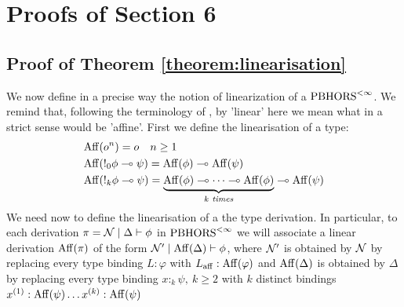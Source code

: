 \section{Proofs of Section 6}
\subsection{Proof of Theorem \ref{theorem:linearisation}}
 We now define in a precise way the notion of linearization of a $\text{PBHORS}^{<\infty}$. We remind that, following the terminology of \cite{DBLP:conf/lics/LiMO22}, by 'linear' here we mean what in a strict sense would be 'affine'.  First we define the linearisation of a type:
\begin{align*}
	&{\mathrm{Aff}}(o^n) =o \quad n \geq 1\\
	&{\mathrm{Aff}}({!_0 \phi \multimap \psi}) = {\mathrm{Aff}}(\phi) \multimap {\mathrm{Aff}}(\psi) \\  
	&{\mathrm{Aff}}({!_k \phi \multimap \psi}) = \underbrace{{\mathrm{Aff}}(\phi) \multimap \dots \multimap {\mathrm{Aff}}(\phi)}_{k \textit{ times}} \multimap {\mathrm{Aff}}(\psi)
\end{align*}
We need now to define the linearisation of a the type derivation. In particular, to each derivation $\pi = \mathcal{N} \mid \Delta \vdash \phi$ in $\text{PBHORS}^{<\infty}$ we will associate a linear derivation ${\mathrm{Aff}}(\pi)$ of the form $\mathcal{N}' \mid {\mathrm{Aff}}(\Delta) \vdash \phi$, where  $\mathcal{N}'$ is obtained by $\mathcal{N} $ by replacing every type binding $L:\varphi $ with $L_{\mathrm{aff}}: {\mathrm{Aff}}(\varphi)$ and ${\mathrm{Aff}}(\Delta)$ is obtained by $\Delta$ by replacing every type binding $x:_k \psi, \: k \geq 2$ with $k$ distinct bindings $x^{(1)}:{\mathrm{Aff}}(\psi) \dots x^{(k)}:{\mathrm{Aff}}(\psi)$
